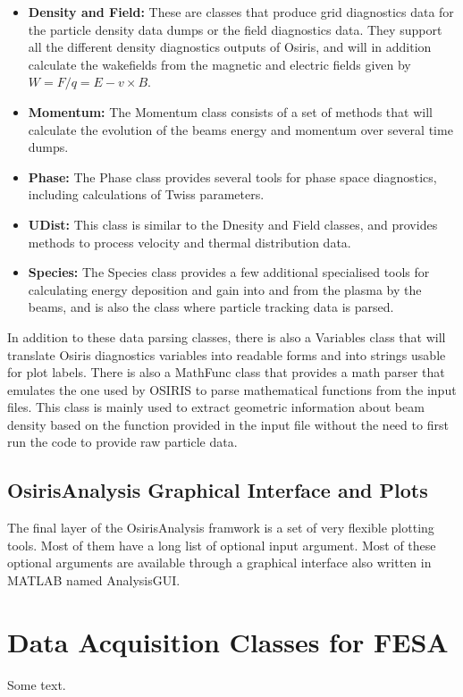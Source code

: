 \begin{itemize}
    \item \textbf{Density and Field:} These are classes that produce grid diagnostics data for the particle density data dumps or the field diagnostics data. They support all the different density diagnostics outputs of Osiris, and will in addition calculate the wakefields from the magnetic and electric fields given by $W = F/q = E - v \times B$.
    \item \textbf{Momentum:} The Momentum class consists of a set of methods that will calculate the evolution of the beams energy and momentum over several time dumps.
    \item \textbf{Phase:} The Phase class provides several tools for phase space diagnostics, including calculations of Twiss parameters.
    \item \textbf{UDist:} This class is similar to the Dnesity and Field classes, and provides methods to process velocity and thermal distribution data.
    \item \textbf{Species:} The Species class provides a few additional specialised tools for calculating energy deposition and gain into and from the plasma by the beams, and is also the class where particle tracking data is parsed.
\end{itemize}

In addition to these data parsing classes, there is also a Variables class that will translate Osiris diagnostics variables into readable forms and into strings usable for plot labels. There is also a MathFunc class that provides a math parser that emulates the one used by OSIRIS to parse mathematical functions from the input files. This class is mainly used to extract geometric information about beam density based on the function provided in the input file without the need to first run the code to provide raw particle data.

\subsection{OsirisAnalysis Graphical Interface and Plots}
\label{Tools:OALay3}

The final layer of the OsirisAnalysis framwork is a set of very flexible plotting tools. Most of them have a long list of optional input argument. Most of these optional arguments are available through a graphical interface also written in MATLAB named AnalysisGUI.

\section{Data Acquisition Classes for FESA}
\label{Tools:FESA}

Some text.

